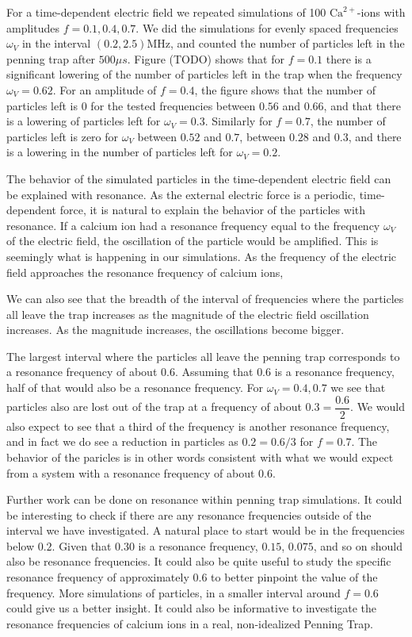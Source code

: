 For a time-dependent electric field we repeated simulations of 100 $\text{Ca}^{2+}$-ions with amplitudes $f = 0.1, 0.4, 0.7$. We did the simulations for evenly spaced frequencies $\omega_V$ in the interval $(0.2, 2.5)\text{MHz}$, and counted the number of particles left in the penning trap after $500\mu s$. Figure (TODO) shows that for $f=0.1$ there is a significant lowering of the number of particles left in the trap when the frequency $\omega_V = 0.62$. For an amplitude of $f=0.4$, the figure shows that the number of particles left is 0 for the tested frequencies between $0.56$ and $0.66$, and that there is a lowering of particles left for $\omega_V=0.3$. Similarly for $f=0.7$, the number of particles left is zero for $\omega_V$ between $0.52$ and $0.7$, between $0.28$ and $0.3$, and there is a lowering in the number of particles left for $\omega_V = 0.2$. 

 The behavior of the simulated particles in the time-dependent electric field can be explained with resonance. As the external electric force is a periodic, time-dependent force, it is natural to explain the behavior of the particles with resonance. If a calcium ion had a resonance frequency equal to the frequency $\omega_V$ of the electric field, the oscillation of the particle would be amplified. This is seemingly what is happening in our simulations. As the frequency of the electric field approaches the resonance frequency of calcium ions, 

We can also see that the breadth of the interval of frequencies where the particles all leave the trap increases as the magnitude of the electric field oscillation increases. As the magnitude increases, the oscillations become bigger.

The largest interval where the particles all leave the penning trap corresponds to a resonance frequency of about $0.6$. Assuming that $0.6$ is a resonance frequency, half of that would also be a resonance frequency. For $\omega_V=0.4, 0.7$ we see that particles also are lost out of the trap at a frequency of about $0.3=\dfrac{0.6}{2}$. We would also expect to see that a third of the frequency is another resonance frequency, and in fact we do see a reduction in particles as $0.2=0.6/3$ for $f=0.7$. The behavior of the paricles is in other words consistent with what we would expect from a system with a resonance frequency of about $0.6$.

Further work can be done on resonance within penning trap simulations. It could be interesting to check if there are any resonance frequencies outside of the interval we have investigated. A natural place to start would be in the frequencies below $0.2$. Given that $0.30$ is a resonance frequency, $0.15$, $0.075$, and so on should also be resonance frequencies. It could also be quite useful to study the specific resonance frequency of approximately $0.6$ to better pinpoint the value of the frequency. More simulations of particles, in a smaller interval around $f=0.6$ could give us a better insight. It could also be informative to investigate the resonance frequencies of calcium ions in a real, non-idealized Penning Trap. 